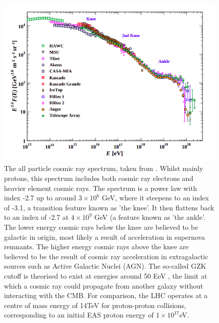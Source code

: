 \begin{figure}
\begin{center}  

\includegraphics[width=\columnwidth]{figures/pdgcr.png}
 
\caption{The all particle cosmic ray spectrum, taken from \cite{pdg}. Whilst mainly protons, this spectrum includes both cosmic ray electrons and heavier element cosmic rays. The spectrum is a power law with index -2.7 up to around $3 \times 10^6$ GeV, where it steepens to an index of -3.1, a transition feature known as 'the knee'. It then flattens back to an index of -2.7 at $4 \times 10^9$ GeV (a feature known as 'the ankle'. The lower energy cosmic rays below the knee are believed to be galactic in origin, most likely a result of acceleration in supernova remnants. The higher energy cosmic rays above the knee are believed to be the result of cosmic ray acceleration in extragalactic sources such as Active Galactic Nuclei (AGN). The so-called GZK cutoff is theorised to exist at energies around 50 EeV \cite{gzk}, the limit at which a cosmic ray could propagate from another galaxy without interacting with the CMB. For comparison, the LHC operates at a centre of mass energy of 14TeV for proton-proton collisions, corresponding to an initial EAS proton energy of $1\times 10^{17}$eV.}
\label{fig:crspec}
\end{center}
\end{figure}

